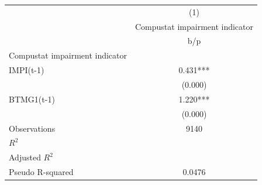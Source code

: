 {
\def\sym#1{\ifmmode^{#1}\else\(^{#1}\)\fi}
\begin{tabular}{l*{1}{c}}
\hline\hline
                    &\multicolumn{1}{c}{(1)}\\
                    &\multicolumn{1}{c}{Compustat impairment indicator}\\
                    &         b/p   \\
\hline
Compustat impairment indicator&               \\
IMPI(t-1)           &       0.431***\\
                    &     (0.000)   \\
BTMG1(t-1)          &       1.220***\\
                    &     (0.000)   \\
\hline
Observations        &        9140   \\
\(R^{2}\)           &               \\
Adjusted \(R^{2}\)  &               \\
Pseudo R-squared    &      0.0476   \\
\hline\hline
\end{tabular}
}
